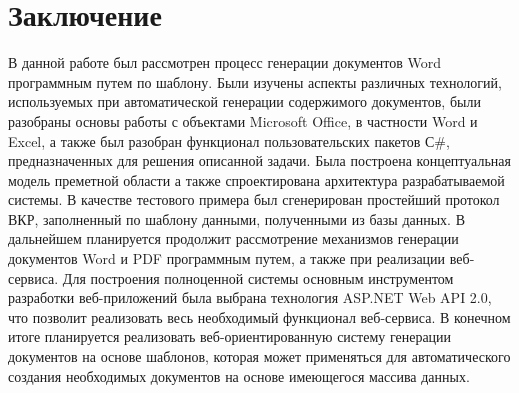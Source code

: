 \chapter*{Заключение}

В данной работе был рассмотрен процесс генерации документов Word программным путем по шаблону. Были изучены аспекты различных технологий, используемых при автоматической генерации содержимого документов, были разобраны основы работы с объектами Microsoft Office, в частности Word и Excel, а также был разобран функционал пользовательских пакетов С#, предназначенных для решения описанной задачи. Была построена концептуальная модель преметной области а также спроектирована архитектура разрабатываемой системы. В качестве тестового примера был сгенерирован простейший протокол ВКР, заполненный по шаблону данными, полученными из базы данных.
В дальнейшем планируется продолжит рассмотрение механизмов генерации документов Word и PDF программным путем, а также при реализации веб-сервиса. Для построения полноценной системы основным инструментом разработки веб-приложений была выбрана технология ASP.NET Web API 2.0, что позволит реализовать весь необходимый функционал веб-сервиса.
    В конечном итоге планируется реализовать веб-ориентированную систему генерации документов на основе шаблонов, которая может применяться для автоматического создания необходимых документов на основе имеющегося массива данных.

